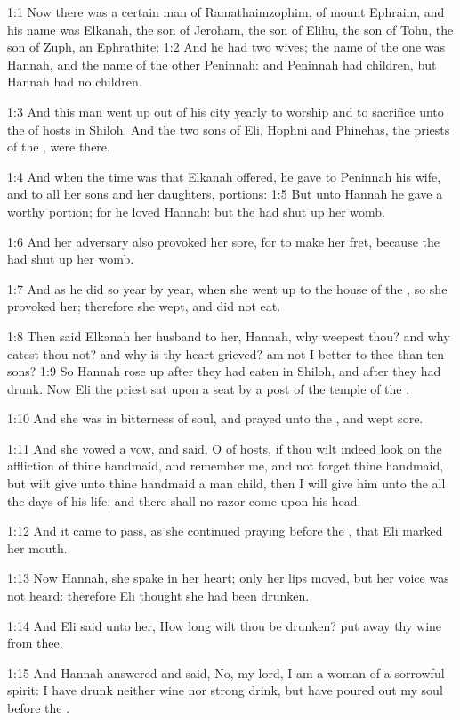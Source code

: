 
1:1 Now there was a certain man of Ramathaimzophim, of mount Ephraim,
and his name was Elkanah, the son of Jeroham, the son of Elihu, the
son of Tohu, the son of Zuph, an Ephrathite: 1:2 And he had two wives;
the name of the one was Hannah, and the name of the other Peninnah:
and Peninnah had children, but Hannah had no children.

1:3 And this man went up out of his city yearly to worship and to
sacrifice unto the \LORD of hosts in Shiloh. And the two sons of Eli,
Hophni and Phinehas, the priests of the \LORD, were there.

1:4 And when the time was that Elkanah offered, he gave to Peninnah
his wife, and to all her sons and her daughters, portions: 1:5 But
unto Hannah he gave a worthy portion; for he loved Hannah: but the
\LORD had shut up her womb.

1:6 And her adversary also provoked her sore, for to make her fret,
because the \LORD had shut up her womb.

1:7 And as he did so year by year, when she went up to the house of
the \LORD, so she provoked her; therefore she wept, and did not eat.

1:8 Then said Elkanah her husband to her, Hannah, why weepest thou?
and why eatest thou not? and why is thy heart grieved? am not I better
to thee than ten sons?  1:9 So Hannah rose up after they had eaten in
Shiloh, and after they had drunk. Now Eli the priest sat upon a seat
by a post of the temple of the \LORD.

1:10 And she was in bitterness of soul, and prayed unto the \LORD, and
wept sore.

1:11 And she vowed a vow, and said, O \LORD of hosts, if thou wilt
indeed look on the affliction of thine handmaid, and remember me, and
not forget thine handmaid, but wilt give unto thine handmaid a man
child, then I will give him unto the \LORD all the days of his life,
and there shall no razor come upon his head.

1:12 And it came to pass, as she continued praying before the \LORD,
that Eli marked her mouth.

1:13 Now Hannah, she spake in her heart; only her lips moved, but her
voice was not heard: therefore Eli thought she had been drunken.

1:14 And Eli said unto her, How long wilt thou be drunken? put away
thy wine from thee.

1:15 And Hannah answered and said, No, my lord, I am a woman of a
sorrowful spirit: I have drunk neither wine nor strong drink, but have
poured out my soul before the \LORD.

